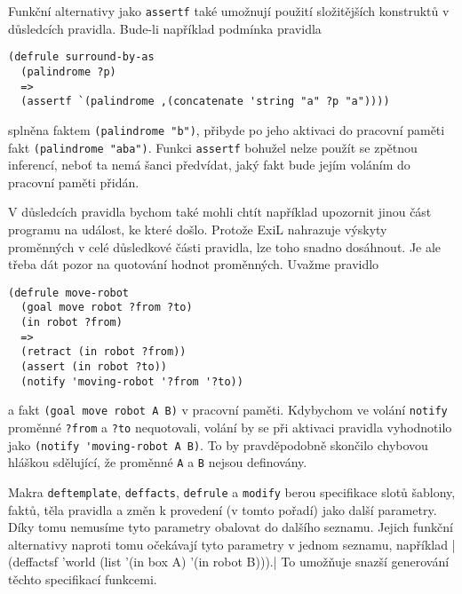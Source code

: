 Funkční alternativy jako \verb|assertf| také umožnují použití složitějších
konstruktů v důsledcích pravidla. Bude-li například podmínka pravidla
\begin{verbatim}
(defrule surround-by-as
  (palindrome ?p)
  =>
  (assertf `(palindrome ,(concatenate 'string "a" ?p "a"))))
\end{verbatim}
splněna faktem \verb|(palindrome "b")|, přibyde po jeho aktivaci do pracovní
paměti fakt \verb|(palindrome "aba")|. Funkci \verb|assertf| bohužel nelze
použít se zpětnou inferencí, neboť ta nemá šanci předvídat, jaký fakt bude
jejím voláním do pracovní paměti přidán.

V důsledcích pravidla bychom také mohli chtít například upozornit jinou část
programu na událost, ke které došlo. Protože ExiL nahrazuje výskyty
proměnných v celé důsledkové části pravidla, lze toho snadno dosáhnout. Je ale
třeba dát pozor na quotování hodnot proměnných. Uvažme pravidlo
\begin{verbatim}
(defrule move-robot
  (goal move robot ?from ?to)
  (in robot ?from)
  =>
  (retract (in robot ?from))
  (assert (in robot ?to))
  (notify 'moving-robot '?from '?to))
\end{verbatim}
a fakt \verb|(goal move robot A B)| v pracovní paměti. Kdybychom ve volání
\verb|notify| proměnné \verb|?from| a \verb|?to| nequotovali, volání by se při
aktivaci pravidla vyhodnotilo jako \verb|(notify 'moving-robot A B)|. To by
pravděpodobně skončilo chybovou hláškou sdělující, že proměnné \verb|A| a
\verb|B| nejsou definovány.

Makra \verb|deftemplate|, \verb|deffacts|, \verb|defrule| a \verb|modify| berou
specifikace slotů šablony, faktů, těla pravidla a změn k provedení (v tomto
pořadí) jako další parametry. Díky tomu nemusíme tyto parametry obalovat do
dalšího seznamu. Jejich funkční alternativy naproti tomu očekávají tyto
parametry v jednom seznamu, například
\cl|(deffactsf 'world (list '(in box A) '(in robot B))).|
To umožňuje snazší generování těchto specifikací funkcemi.
